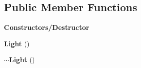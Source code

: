 \subsection*{Public Member Functions}
\begin{Indent}\textbf{ Constructors/\+Destructor}\par
\begin{DoxyCompactItemize}
\item 
\mbox{\label{classrev_1_1_light_a59432efc4acfd753d0895c7bd71ceb57}} 
{\bfseries Light} ()
\item 
\mbox{\label{classrev_1_1_light_a0857f90d0f10cef5550cc8478ac566bb}} 
{\bfseries $\sim$\+Light} ()
\end{DoxyCompactItemize}
\end{Indent}
